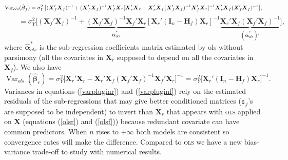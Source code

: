 \documentclass[12pt,a4paper]{report}
\begin{document}
\begin{displaymath}\fontsize{10}{10}\selectfont{
	\operatorname{Var}_{ols}(\hat{\boldsymbol{\beta}}_{f})=\sigma_Y^2\big[ 
(\boldsymbol{X}_f'\boldsymbol{X}_f)^{-1}+(\boldsymbol{X}_f'\boldsymbol{X}_f)^{-1}\boldsymbol{X}_f'\boldsymbol{X}_r
[\boldsymbol{X}_r'\boldsymbol{X}_r-\boldsymbol{X}_r'\boldsymbol{X}_f(\boldsymbol{X}_f'\boldsymbol{X}_f)^{-1}\boldsymbol{X}_f'\boldsymbol{X}_r]^{-1}
\boldsymbol{X}_r'\boldsymbol{X}_f(\boldsymbol{X}_f'\boldsymbol{X}_f)^{-1}\big] }, 
\end{displaymath}
\begin{equation}
\qquad = \sigma_Y^2\big[ 
(\boldsymbol{X}_f'\boldsymbol{X}_f)^{-1}+\underbrace{(\boldsymbol{X}_f'\boldsymbol{X}_f)^{-1}\boldsymbol{X}_f'\boldsymbol{X}_r}_{\hat{\boldsymbol{\alpha}}^*_{ols}}
[ \boldsymbol{X}_r'(\boldsymbol{I}_n-\boldsymbol{H}_f)\boldsymbol{X}_r]^{-1}
\underbrace{\boldsymbol{X}_r'\boldsymbol{X}_f(\boldsymbol{X}_f'\boldsymbol{X}_f)^{-1}}_{(\hat{\boldsymbol{\alpha}}^*_{ols})'}\big] ,\label{olsf}
\end{equation}
where $\hat{\boldsymbol{\alpha}}^*_{ols}$ is the sub-regression coefficients matrix estimated by {\sc ols} without parsimony (all the covariates in $\boldsymbol{X}_r$ supposed to depend on all the covariates in $\boldsymbol{X}_f$).
We also have
\begin{equation}
	\operatorname{Var}_{ols}(\hat{\boldsymbol{\beta}}_{r})=
	\sigma_Y^2\big[ \boldsymbol{X}_r'\boldsymbol{X}_r-\boldsymbol{X}_r'\boldsymbol{X}_f(\boldsymbol{X}_f'\boldsymbol{X}_f)^{-1}\boldsymbol{X}_f'\boldsymbol{X}_r\big]^{-1}
	=\sigma_Y^2\big[ \boldsymbol{X}_r'(\boldsymbol{I}_n-\boldsymbol{H}_f)\boldsymbol{X}_r\big]^{-1}. \label{olsr}
\end{equation}
Variances in equations (\ref{varpluginr}) and (\ref{varpluginf}) rely on the estimated residuals of the sub-regressions that may give better conditioned matrices ($\boldsymbol{\varepsilon}_j$'s are supposed to be independent) to invert than $\boldsymbol{X}_r$ that appears with \textsc{ols} applied on $\boldsymbol{X}$ (equations (\ref{olsr}) and (\ref{olsf})) because redundant covariate can have common predictors. %
When $n$ rises to $+\infty$ both models are consistent so convergence rates will make the difference.
Compared to \textsc{ols} we have a new bias-variance trade-off to study with numerical results.\\
\end{document}

